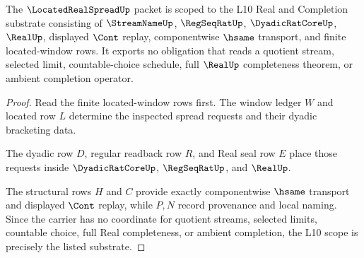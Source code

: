 \begin{theorem}
\label{thm:located-real-spread-l10-scope}
The $\LocatedRealSpreadUp$ packet is scoped to the L10 Real and Completion substrate consisting of $\StreamNameUp$, $\RegSeqRatUp$, $\DyadicRatCoreUp$, $\RealUp$, displayed $\Cont$ replay, componentwise $\hsame$ transport, and finite located-window rows. It exports no obligation that reads a quotient stream, selected limit, countable-choice schedule, full $\RealUp$ completeness theorem, or ambient completion operator.
\end{theorem}
\begin{proof}
Read the finite located-window rows first. The window ledger $W$ and located row $L$ determine the inspected spread requests and their dyadic bracketing data.

The dyadic row $D$, regular readback row $R$, and Real seal row $E$ place those requests inside $\DyadicRatCoreUp$, $\RegSeqRatUp$, and $\RealUp$.

The structural rows $H$ and $C$ provide exactly componentwise $\hsame$ transport and displayed $\Cont$ replay, while $P,N$ record provenance and local naming. Since the carrier has no coordinate for quotient streams, selected limits, countable choice, full Real completeness, or ambient completion, the L10 scope is precisely the listed substrate.
\end{proof}




